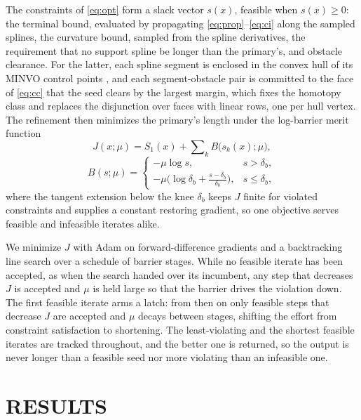 \documentclass[letterpaper, 10 pt, conference]{ieeeconf}
\theoremstyle{remark}
\begin{document}
The constraints of \eqref{eq:opt} form a slack vector $s(x)$, feasible when
$s(x) \ge 0$: the terminal bound, evaluated by propagating
\eqref{eq:prop}--\eqref{eq:ci} along the sampled splines, the curvature
bound, sampled from the spline derivatives, the requirement that no support
spline be longer than the primary's, and obstacle clearance. For the latter,
each spline segment is enclosed in the convex hull of its MINVO control
points \cite{tordesillas2022minvo}, and each segment-obstacle pair is
committed to the face of \eqref{eq:cc} that the seed clears by the largest
margin, which fixes the homotopy class and replaces the disjunction over
faces with linear rows, one per hull vertex. The refinement then minimizes
the primary's length under the log-barrier merit function
\begin{equation}
  J(x;\mu) = S_1(x) + \sum\nolimits_k B\big(s_k(x);\mu\big),
  \label{eq:merit}
\end{equation}
\begin{equation}
  B(s;\mu) =
  \begin{cases}
    -\mu \log s, & s > \delta_b, \\[2pt]
    -\mu \big( \log\delta_b + \tfrac{s-\delta_b}{\delta_b} \big), & s \le \delta_b,
  \end{cases}
  \label{eq:barrier}
\end{equation}
where the tangent extension below the knee $\delta_b$ keeps $J$ finite for
violated constraints and supplies a constant restoring gradient, so one
objective serves feasible and infeasible iterates alike.

We minimize $J$ with Adam \cite{kingma2015adam} on forward-difference
gradients and a backtracking line search over a schedule of barrier stages.
While no feasible iterate has been accepted, as when the search handed over
its incumbent, any step that decreases $J$ is accepted and $\mu$ is held
large so that the barrier drives the violation down. The first feasible
iterate arms a latch: from then on only feasible steps that decrease $J$ are
accepted and $\mu$ decays between stages, shifting the effort from
constraint satisfaction to shortening. The least-violating and the shortest
feasible iterates are tracked throughout, and the better one is returned, so
the output is never longer than a feasible seed nor more violating than an
infeasible one.

\section{RESULTS}
\label{sec:results}
\end{document}
